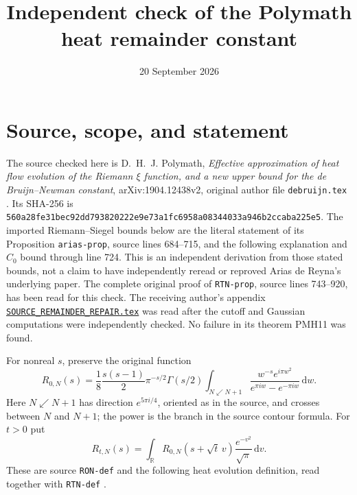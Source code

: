 \documentclass[11pt]{article}
\title{Independent check of the Polymath heat remainder constant}
\date{20 September 2026}
\newcommand{\R}{\mathbb R}
\newcommand{\dd}{\,\mathrm d}
\begin{document}
\maketitle

\section{Source, scope, and statement}

The source checked here is D.~H.~J. Polymath,
\emph{Effective approximation of heat flow evolution of the Riemann
$\xi$ function, and a new upper bound for the de Bruijn--Newman
constant}, arXiv:1904.12438v2, original author file
\texttt{debruijn.tex} \cite{polymath}. Its SHA-256 is
\texttt{560a28fe31bec92dd793820222e9e73a1fc6958a08344033a946b2ccaba225e5}.
The imported Riemann--Siegel bounds below are the literal statement
of its Proposition \texttt{arias-prop}, source lines 684--715,
and the following explanation and $C_0$ bound through line 724.
This is an independent derivation from those stated bounds, not
a claim to have independently reread or reproved Arias de Reyna's
underlying paper. The complete original proof of
\texttt{RTN-prop}, source lines 743--920, has been read for this check.
The receiving author's appendix \href{https://github.com/KokunoYumeto/zeta-function-research-reader/blob/5992ad50c0f2a06921f1fcaded7b4e38097c0739/workbenches/splitzero-tandem/continuations/20260920-original-kernel-mixed-determinants/providers/SOURCE_REMAINDER_REPAIR.tex\#L1}{\texttt{SOURCE\_REMAINDER\_REPAIR.tex}}
was read after the cutoff and Gaussian computations were independently
checked. No failure in its theorem PMH11 was found.

For nonreal $s$, preserve the original function
\begin{equation}\label{defR}
 R_{0,N}(s)=\frac18\frac{s(s-1)}2\pi^{-s/2}\Gamma(s/2)
 \int_{N\swarrow N+1}
 \frac{w^{-s}e^{i\pi w^2}}{e^{\pi iw}-e^{-\pi iw}}\dd w.
\end{equation}
Here $N\swarrow N+1$ has direction $e^{5\pi i/4}$, oriented as
in the source, and crosses between $N$ and $N+1$; the power is
the branch in the source contour formula. For $t>0$ put
\begin{equation}\label{heatR}
 R_{t,N}(s)=\int_\R R_{0,N}(s+\sqrt t\,v)
                      \frac{e^{-v^2}}{\sqrt\pi}\dd v.
\end{equation}
These are source \texttt{RON-def} and the following heat evolution
definition, read together with \texttt{RTN-def} \cite{polymath}.
\end{document}
